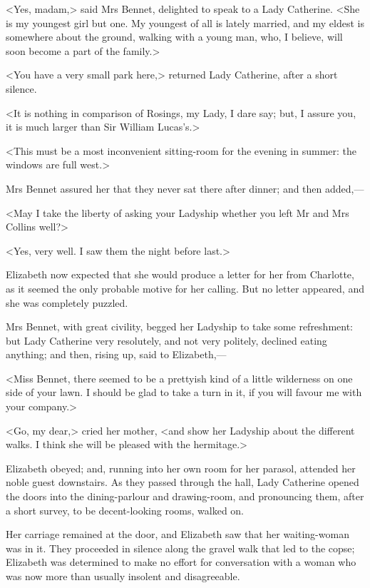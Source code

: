 <Yes, madam,> said Mrs Bennet, delighted to speak to a Lady Catherine. <She is my youngest girl but one. My youngest of all is lately married, and my eldest is somewhere about the ground, walking with a young man, who, I believe, will soon become a part of the family.>

<You have a very small park here,> returned Lady Catherine, after a short silence.

<It is nothing in comparison of Rosings, my Lady, I dare say; but, I assure you, it is much larger than Sir William Lucas's.>

<This must be a most inconvenient sitting-room for the evening in summer: the windows are full west.>

Mrs Bennet assured her that they never sat there after dinner; and then added,—

<May I take the liberty of asking your Ladyship whether you left Mr and Mrs Collins well?>

<Yes, very well. I saw them the night before last.>

Elizabeth now expected that she would produce a letter for her from Charlotte, as it seemed the only probable motive for her calling. But no letter appeared, and she was completely puzzled.

Mrs Bennet, with great civility, begged her Ladyship to take some refreshment: but Lady Catherine very resolutely, and not very politely, declined eating anything; and then, rising up, said to Elizabeth,—

<Miss Bennet, there seemed to be a prettyish kind of a little wilderness on one side of your lawn. I should be glad to take a turn in it, if you will favour me with your company.>

<Go, my dear,> cried her mother, <and show her Ladyship about the different walks. I think she will be pleased with the hermitage.>

Elizabeth obeyed; and, running into her own room for her parasol, attended her noble guest downstairs. As they passed through the hall, Lady Catherine opened the doors into the dining-parlour and drawing-room, and pronouncing them, after a short survey, to be decent-looking rooms, walked on.

Her carriage remained at the door, and Elizabeth saw that her waiting-woman was in it. They proceeded in silence along the gravel walk that led to the copse; Elizabeth was determined to make no effort for conversation with a woman who was now more than usually insolent and disagreeable.


